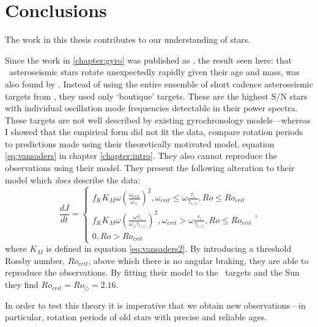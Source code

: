 \chapter{Conclusions}
\label{chapter:conclusions}

The work in this thesis contributes to our understanding of stars.

Since the work in \ref{chapter:gyro} was published as \citet{Angus2015}, the
result seen here: that \kepler\ asteroseismic stars rotate unexpectedly
rapidly given their age and mass, was also found by \citet{Vansaders2016}.
Instead of using the entire ensemble of short cadence asteroseismic targets
from \citet{Chaplin2014}, they used only `boutique' targets.
These are the highest S/N stars with individual oscillation mode frequencies
detectable in their power spectra.
These targets are not well described by existing gyrochronology
models---whereas I showed that the \citet{Barnes2007} empirical form did not
fit the data, \citet{Vansaders2016} compare rotation periods to predictions
made using their theoretically motivated model, equation \ref{eq:vansaders} in
chapter \ref{chapter:intro}.
They also cannot reproduce the observations using their model.
They present the following alteration to their model which {\it does} describe
the data:
\begin{equation}
\frac{dJ}{dt} = \left\{
                \begin{array}{ll}
                  f_K K_M \omega \left( \frac{\omega_{crit}}{\omega_\odot}
                  \right)^2, \omega_{crit} \leq \omega
                  \frac{\tau_{c}}{\tau_{c, \odot}}, Ro \leq Ro_{crit} \\
                  f_K K_M \omega \left( \frac{\omega\tau_{c}}
                  {\omega_\odot\tau_{c, \odot}}
                  \right)^2, \omega_{crit} > \omega
                  \frac{\tau_{c}}{\tau_{c, \odot}}, Ro \leq Ro_{crit} \\
                  0, Ro > Ro_{crit}
                \end{array}
              \right.,
\end{equation}
where $K_M$ is defined in equation \ref{eq:vansaders2}.
By introducing a threshold Rossby number, $Ro_{crit}$, above which there is
no angular braking, they are able to reproduce the observations.
By fitting their model to the \kepler\ targets and the Sun they find
$Ro_{crit} = Ro_\odot = 2.16$.

In order to test this theory it is imperative that we obtain new
observations---in particular, rotation periods of old stars with precise and
reliable ages.
